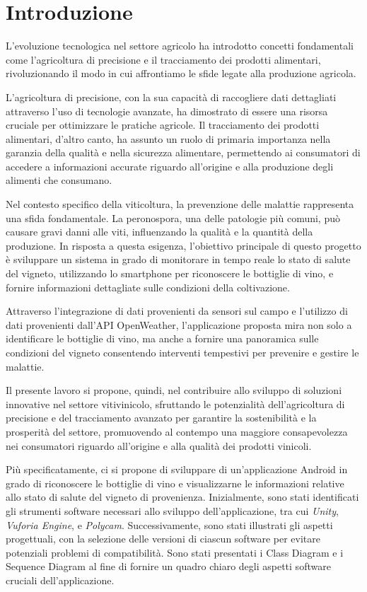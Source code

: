 {}
\chapter*{Introduzione}

L'evoluzione tecnologica nel settore agricolo ha introdotto concetti fondamentali come l'agricoltura di precisione e il tracciamento dei prodotti alimentari, rivoluzionando il modo in cui affrontiamo le sfide legate alla produzione agricola.

L'agricoltura di precisione, con la sua capacità di raccogliere dati dettagliati attraverso l'uso di tecnologie avanzate, ha dimostrato di essere una risorsa cruciale per ottimizzare le pratiche agricole. Il tracciamento dei prodotti alimentari, d'altro canto, ha assunto un ruolo di primaria importanza nella garanzia della qualità e nella sicurezza alimentare, permettendo ai consumatori di accedere a informazioni accurate riguardo all'origine e alla produzione degli alimenti che consumano.

Nel contesto specifico della viticoltura, la prevenzione delle malattie rappresenta una sfida fondamentale. La peronospora, una delle patologie più comuni, può causare gravi danni alle viti, influenzando la qualità e la quantità della produzione. In risposta a questa esigenza, l'obiettivo principale di questo progetto è sviluppare un sistema in grado di monitorare in tempo reale lo stato di salute del vigneto, utilizzando lo smartphone per riconoscere le bottiglie di vino, e fornire informazioni dettagliate sulle condizioni della coltivazione.

Attraverso l'integrazione di dati provenienti da sensori sul campo e l'utilizzo di dati provenienti dall'API OpenWeather, l'applicazione proposta mira non solo a identificare le bottiglie di vino, ma anche a fornire una panoramica sulle condizioni del vigneto consentendo interventi tempestivi per prevenire e gestire le malattie.

Il presente lavoro si propone, quindi, nel contribuire allo sviluppo di soluzioni innovative nel settore vitivinicolo, sfruttando le potenzialità dell'agricoltura di precisione e del tracciamento avanzato per garantire la sostenibilità e la prosperità del settore, promuovendo al contempo una maggiore consapevolezza nei consumatori riguardo all'origine e alla qualità dei prodotti vinicoli.

Più specificatamente, ci si propone di sviluppare di un'applicazione Android in grado di riconoscere le bottiglie di vino e visualizzarne le informazioni relative allo stato di salute del vigneto di provenienza. Inizialmente, sono stati identificati gli strumenti software necessari allo sviluppo dell'applicazione, tra cui \textit{Unity}, \textit{Vuforia Engine}, e \textit{Polycam}. Successivamente, sono stati illustrati gli aspetti progettuali, con la selezione delle versioni di ciascun software per evitare potenziali problemi di compatibilità. Sono stati presentati i Class Diagram e i Sequence Diagram al fine di fornire un quadro chiaro degli aspetti software cruciali dell'applicazione.

